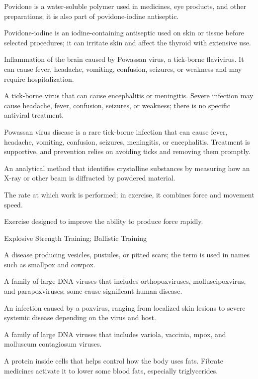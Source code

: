  Povidone is a water-soluble polymer used in medicines, eye products, and other preparations; it is also part of povidone-iodine antiseptic.

 Povidone-iodine is an iodine-containing antiseptic used on skin or tissue before selected procedures; it can irritate skin and affect the thyroid with extensive use.

 Inflammation of the brain caused by Powassan virus, a tick-borne flavivirus. It can cause fever, headache, vomiting, confusion, seizures, or weakness and may require hospitalization.

 A tick-borne virus that can cause encephalitis or meningitis. Severe infection may cause headache, fever, confusion, seizures, or weakness; there is no specific antiviral treatment.

 Powassan virus disease is a rare tick-borne infection that can cause fever, headache, vomiting, confusion, seizures, meningitis, or encephalitis. Treatment is supportive, and prevention relies on avoiding ticks and removing them promptly.

 An analytical method that identifies crystalline substances by measuring how an X-ray or other beam is diffracted by powdered material.

 The rate at which work is performed; in exercise, it combines force and movement speed.

 Exercise designed to improve the ability to produce force rapidly.

\synonyms
Explosive Strength Training; Ballistic Training

 A disease producing vesicles, pustules, or pitted scars; the term is used in names such as smallpox and cowpox.

 A family of large DNA viruses that includes orthopoxviruses, molluscipoxvirus, and parapoxviruses; some cause significant human disease.

 An infection caused by a poxvirus, ranging from localized skin lesions to severe systemic disease depending on the virus and host.

 A family of large DNA viruses that includes variola, vaccinia, mpox, and molluscum contagiosum viruses.

 A protein inside cells that helps control how the body uses fats. Fibrate medicines activate it to lower some blood fats, especially triglycerides.

